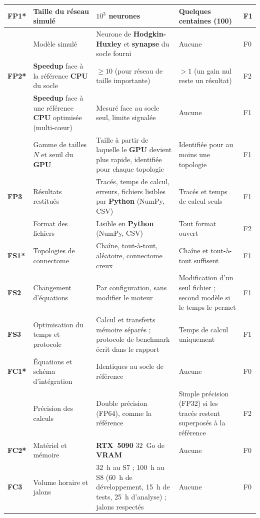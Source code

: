 \documentclass{report}
\begin{document}
{\begin{longtable}{|p{1.0cm}|p{4.6cm}|p{4.3cm}|p{3.4cm}|p{0.8cm}|}
\rowcolor{whybg} \textbf{FP1*} & Taille du réseau simulé & $10^3$ neurones & Quelques centaines (100) & F1 \\ \hline
\rowcolor{whybg} & Modèle simulé & Neurone de \textbf{Hodgkin-Huxley} et \textbf{synapse} du socle fourni & Aucune & F0 \\ \hline
\rowcolor{whybg} \textbf{FP2*} & \textbf{Speedup} face à la référence \textbf{CPU} du socle & $\geq 10$ (pour réseau de taille importante) & $> 1$ (un gain nul reste un résultat) & F2 \\ \hline
\rowcolor{whybg} & \textbf{Speedup} face à une référence \textbf{CPU} optimisée (multi-cœur) & Mesuré face au socle seul, limite signalée & Aucune & F1 \\ \hline
\rowcolor{whybg} & Gamme de tailles $N$ et seuil du \textbf{GPU} & Taille à partir de laquelle le \textbf{GPU} devient plus rapide, identifiée pour chaque topologie & Identifiée pour au moins une topologie & F1 \\ \hline
\rowcolor{whybg} \textbf{FP3} & Résultats restitués & Tracés, temps de calcul, erreurs, fichiers lisibles par \textbf{Python} (NumPy, CSV) & Tracés et temps de calcul seuls & F1 \\ \hline
\rowcolor{whybg} & Format des fichiers & Lisible en \textbf{Python} (NumPy, CSV) & Tout format ouvert & F2 \\ \hline
\rowcolor{whatbg} \textbf{FS1*} & Topologies de connectome & Chaîne, tout-à-tout, aléatoire, connectome creux & Chaîne et tout-à-tout suffisent & F1 \\ \hline
\rowcolor{whatbg} \textbf{FS2} & Changement d'équations & Par configuration, sans modifier le moteur & Modification d'un seul fichier ; second modèle si le temps le permet & F1 \\ \hline
\rowcolor{whatbg} \textbf{FS3} & Optimisation du temps et protocole & Calcul et transferts mémoire séparés ; protocole de benchmark écrit dans le rapport & Temps de calcul uniquement & F1 \\ \hline
\rowcolor{defibg} \textbf{FC1*} & Équations et schéma d'intégration & Identiques au socle de référence & Aucune & F0 \\ \hline
\rowcolor{defibg} & Précision des calculs & Double précision (FP64), comme la référence & Simple précision (FP32) si les tracés restent superposés à la référence & F2 \\ \hline
\rowcolor{defibg} \textbf{FC2*} & Matériel et mémoire & \textbf{RTX~5090} $32$~Go de \textbf{VRAM} & Aucune & F0 \\ \hline
\rowcolor{defibg} \textbf{FC3} & Volume horaire et jalons & 32~h au S7 ; 100~h au S8 (60~h de développement, 15~h de tests, 25~h d'analyse) ; jalons respectés & Aucune & F0 \\ \hline
\end{longtable}}
\end{document}
